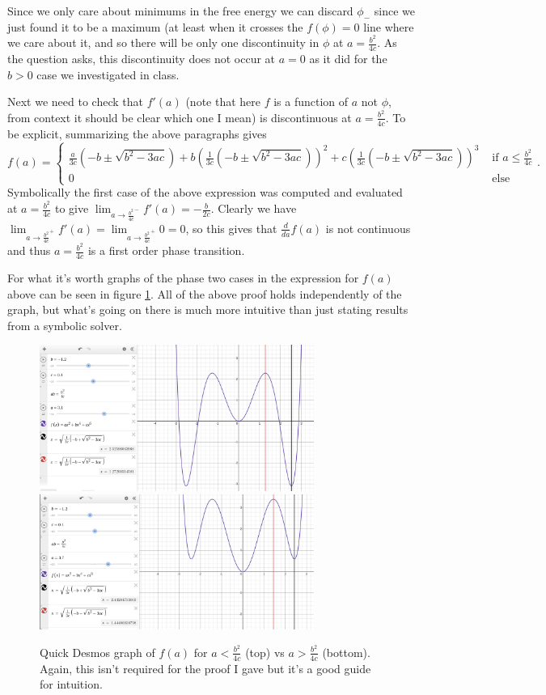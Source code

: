 \documentclass[letterpaper, reqno,11pt]{article}
\begin{document}
Since we only care about minimums in the free energy we can discard $\phi_-$ since we just found it to be a maximum (at least when it crosses the $f(\phi)=0$ line where we care about it, and so there will be only one discontinuity in $\phi$ at $a=\frac{b^2}{4c}$. As the question asks, this discontinuity does not occur at $a=0$ as it did for the $b>0$ case we investigated in class.

Next we need to check that $f'(a)$ (note that here $f$ is a function of $a$ not $\phi$, from context it should be clear which one I mean) is discontinuous at $a=\frac{b^2}{4c}$. To be explicit, summarizing the above paragraphs gives
\[
f(a)=\begin{cases}
    \frac{a}{3c}\left( -b\pm \sqrt{b^2-3ac}\right)+b\left( \frac{1}{3c}\left( -b\pm \sqrt{b^2-3ac} \right)\right)^2+c\left( \frac{1}{3c}\left( -b\pm \sqrt{b^2-3ac} \right)\right)^3 &\text{ if }a\leq \frac{b^2}{4c}\\
    0&\text{ else}
\end{cases}
.\]
Symbolically the first case of the above expression was computed and evaluated at $a=\frac{b^2}{4c}$ to give $\lim_{a\to \frac{b^2}{4c}^{-}}f'(a)=-\frac{b}{2c}$. Clearly we have $\lim_{a\to \frac{b^2}{4c}^{+}}f'(a)=\lim_{a\to \frac{b^2}{4c}^{+}}0=0$, so this gives that $\frac{d}{da}f(a)$ is not continuous and thus $a=\frac{b^2}{4c}$ is a first order phase transition.

For what it's worth graphs of the phase two cases in the expression for $f(a)$ above can be seen in figure \ref{fig:III}. All of the above proof holds independently of the graph, but what's going on there is much more intuitive than just stating results from a symbolic solver.

\begin{figure}[htpb]
    \centering
    \includegraphics[width=0.8\textwidth]{asmall}
    \includegraphics[width=0.8\textwidth]{abig}
    \caption{Quick Desmos graph of $f(a)$ for $a<\frac{b^2}{4c}$ (top) vs $a>\frac{b^2}{4c}$ (bottom). Again, this isn't required for the proof I gave but it's a good guide for intuition.}
    \label{fig:III}
\end{figure}
\end{document}
